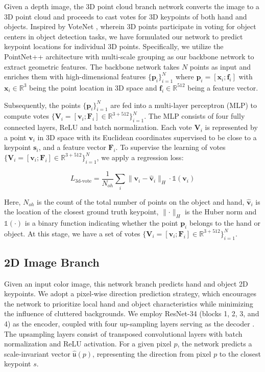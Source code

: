 Given a depth image, the 3D point cloud branch network converts the image to a 3D point cloud and proceeds to cast votes for 3D keypoints of both hand and objects. Inspired by VoteNet \cite{qi2019deep}, wherein 3D points participate in voting for object centers in object detection tasks, we have formulated our network to predict keypoint locations for individual 3D points. Specifically, we utilize the PointNet++ architecture \cite{qi2017pointnet++} with multi-scale grouping as our backbone network to extract geometric features. The backbone network takes $N$ points as input and enriches them with high-dimensional features $\{\mathbf{p}_{i}\}_{i=1}^{N}$ where $\mathbf{p}_{i} = [\mathbf{x}_i; \mathbf{f}_i]$ with $\mathbf{x}_{i}\in\mathbb{R}^{3}$ being the point location in 3D space and $\mathbf{f}_{i} \in \mathbb{R}^{512}$ being a feature vector.

Subsequently, the points $\{\mathbf{p}_{i}\}_{i=1}^{N}$ are fed into a multi-layer perceptron (MLP) to compute votes $\{\mathbf{V}_{i} = [\mathbf{v}_{i}; \mathbf{F}_{i}] \in \mathbb{R}^{3+512} \}_{i=1}^{N}$. The MLP consists of four fully connected layers, ReLU and batch normalization. Each vote $\mathbf{V}_i$ is represented by a point $\mathbf{v}_{i}$ in 3D space with its Euclidean coordinates supervised to be close to a keypoint $\mathbf{s}_i$, and a feature vector $\mathbf{F}_{i}$. To supervise the learning of votes $\{\mathbf{V}_{i} = [\mathbf{v}_{i}; \mathbf{F}_{i}] \in \mathbb{R}^{3+512} \}_{i=1}^{N}$, we apply a regression loss:

\begin{equation}
L_{\text{3d-vote}} = \dfrac{1}{N_{oh}} \sum_{i}  \| \mathbf{v}_{i} - \hat{\mathbf{v}}_{i} \|_{H} \cdot \mathds{1}(\mathbf{v}_{i})
\end{equation}

\noindent Here, $N_{oh}$ is the count of the total number of points on the object and hand, $\hat{\mathbf{v}}_{i}$ is the location of the closest ground truth keypoint, $\parallel\cdot\parallel_{H}$ is the Huber norm and $\mathds{1}(\cdot)$ is a binary function indicating whether the point $\mathbf{p}_i$ belongs to the hand or object. At this stage, we have a set of votes $\{\mathbf{V}_i = [\mathbf{v}_i; \mathbf{F}_i] \in \mathbb{R}^{3+512}\}_{i=1}^{N}$.

\subsection{2D Image Branch}

Given an input color image, this network branch predicts hand and object 2D keypoints. We adopt a pixel-wise direction prediction strategy, which encourages the network to prioritize local hand and object characteristics while minimizing the influence of cluttered backgrounds. We employ ResNet-34 (blocks 1, 2, 3, and 4) as the encoder, coupled with four up-sampling layers serving as the decoder \cite{he2016deep}. The upsampling layers consist of transposed convolutional layers with batch normalization and ReLU activation. For a given pixel $p$, the network predicts a scale-invariant vector $\hat{\mathfrak{u}}(p)$, representing the direction from pixel $p$ to the closest keypoint $s$.

